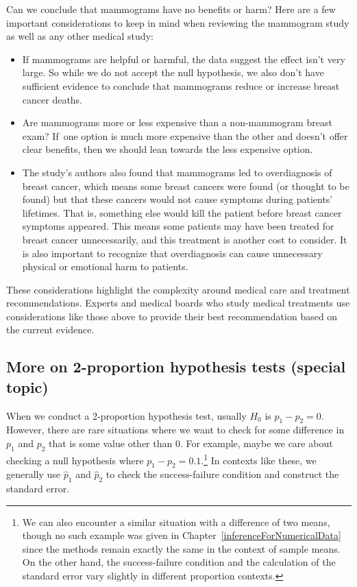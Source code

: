 Can we conclude that mammograms have no benefits or harm? Here are a few important considerations to keep in mind when reviewing the mammogram study as well as any other medical study:
\begin{itemize}
\setlength{\itemsep}{0mm}
\item If mammograms are helpful or harmful, the data suggest the effect isn't very large. So while we do not accept the null hypothesis, we also don't have sufficient evidence to conclude that mammograms reduce or increase breast cancer deaths.
\item Are mammograms more or less expensive than a non-mammogram breast exam? If~one option is much more expensive than the other and doesn't offer clear benefits, then we should lean towards the less expensive option.
\item The study's authors also found that mammograms led to overdiagnosis of breast cancer, which means some breast cancers were found (or thought to be found) but that these cancers would not cause symptoms during patients' lifetimes. That is, something else would kill the patient before breast cancer symptoms appeared. This means some patients may have been treated for breast cancer unnecessarily, and this treatment is another cost to consider. It is also important to recognize that overdiagnosis can cause unnecessary physical or emotional harm to patients.
\end{itemize}
These considerations highlight the complexity around medical care and treatment recommendations. Experts and medical boards who study medical treatments use considerations like those above to provide their best recommendation based on the current evidence.




\subsection{More on 2-proportion hypothesis tests (special topic)}

When we conduct a 2-proportion hypothesis test, usually $H_0$ is $p_1 - p_2 = 0$. However, there are rare situations where we want to check for some difference in $p_1$ and $p_2$ that is some value other than 0. For example, maybe we care about checking a null hypothesis where $p_1 - p_2 = 0.1$.\footnote{We can also encounter a similar situation with a difference of two means, though no such example was given in Chapter~\ref{inferenceForNumericalData} since the methods remain exactly the same in the context of sample means. On the other hand, the success-failure condition and the calculation of the standard error vary slightly in different proportion contexts.} In contexts like these, we generally use $\hat{p}_1$ and $\hat{p}_2$ to check the success-failure condition and construct the standard error.

